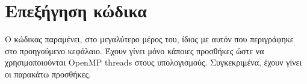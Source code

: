 \section{Επεξήγηση κώδικα}
Ο κώδικας παραμένει, στο μεγαλύτερο μέρος του, ίδιος με αυτόν που περιγράφηκε στο προηγούμενο κεφάλαιο. Έχουν γίνει μόνο κάποιες προσθήκες ώστε να χρησιμοποιούνται OpenMP threads στους υπολογισμούς. Συγκεκριμένα, έχουν γίνει οι παρακάτω προσθήκες. \par